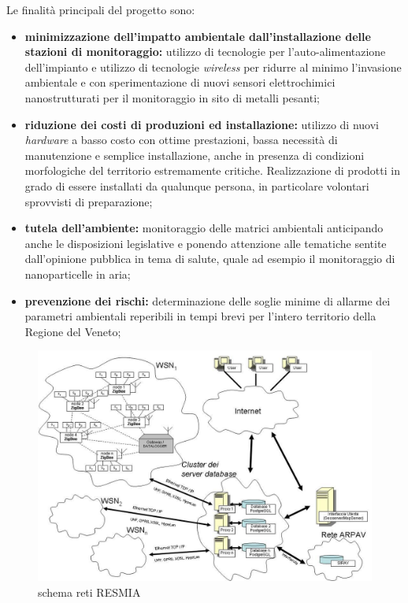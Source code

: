 Le finalità principali del progetto sono:
\begin{itemize}

	\item \textbf{minimizzazione dell'impatto ambientale dall'installazione delle stazioni di monitoraggio:} utilizzo di tecnologie per l'auto-alimentazione dell'impianto e utilizzo di tecnologie \textit{wireless} per ridurre al minimo l'invasione ambientale e con sperimentazione di nuovi sensori elettrochimici nanostrutturati per il monitoraggio in sito di metalli pesanti;
	\item \textbf{riduzione dei costi di produzioni ed installazione:} utilizzo di nuovi \textit{hardware} a basso costo con ottime prestazioni, bassa necessità di manutenzione e semplice installazione, anche in presenza di condizioni morfologiche del territorio estremamente critiche. Realizzazione di prodotti in grado di essere installati da qualunque persona, in particolare volontari sprovvisti di preparazione;
	\item \textbf{tutela dell'ambiente:} monitoraggio delle matrici ambientali anticipando anche le disposizioni legislative e ponendo attenzione alle tematiche sentite dall'opinione pubblica in tema di salute, quale ad esempio il monitoraggio di nanoparticelle in aria;
	\item \textbf{prevenzione dei rischi:} determinazione delle soglie minime di allarme dei parametri ambientali reperibili in tempi brevi per l'intero territorio della Regione del Veneto;

\end{itemize}

\begin{figure}[htbp]
\centering
\includegraphics[scale=0.27]{./capitoli/capitolo1/img/retiresmia}
\caption{schema reti RESMIA}
\end{figure}

